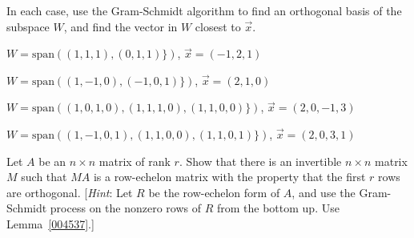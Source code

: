 \documentclass{ximera}
\begin{document}
\begin{problem}
In each case, use the Gram-Schmidt algorithm to find an orthogonal basis of the subspace $W$, and find the vector in $W$ closest to $\vec{x}$.

\begin{problem}\label{ClosestVec1}
$W = \mbox{span}\left((1, 1, 1), (0, 1, 1)\}\right)$, $\vec{x} = (-1, 2, 1)$
\end{problem}

\begin{problem}\label{ClosestVec2}
$W = \mbox{span}\left((1, -1, 0), (-1, 0, 1)\}\right)$, $\vec{x} = (2, 1, 0)$
\end{problem}

\begin{problem}\label{ClosestVec3}
$W = \mbox{span}\left((1, 0, 1, 0), (1, 1, 1, 0), (1, 1, 0, 0)\}\right)$, $\vec{x} = (2, 0, -1, 3)$
\end{problem}

\begin{problem}\label{ClosestVec4}
$W = \mbox{span}\left((1, -1, 0, 1), (1, 1, 0, 0), (1, 1, 0, 1)\}\right)$, $\vec{x} = (2, 0, 3, 1)$
\end{problem}

\end{problem}

\begin{problem}
Let $A$ be an $n \times n$ matrix of rank $r$. Show that there is an invertible $n \times n$ matrix $M$ such that $MA$ is a row-echelon matrix with the property that the first $r$ rows are orthogonal. [\textit{Hint}: Let $R$ be the row-echelon form of $A$, and use the Gram-Schmidt process on the nonzero rows of $R$ from the bottom up. Use Lemma~\ref{004537}.]
\end{problem}
\end{document}
